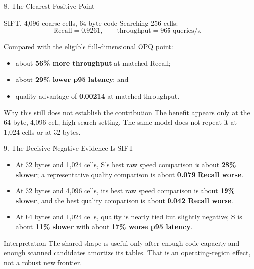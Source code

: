 \documentclass[aspectratio=169]{beamer}
\newcommand{\good}[1]{\textcolor{green!45!black}{\textbf{#1}}}
\newcommand{\bad}[1]{\textcolor{red!75!black}{\textbf{#1}}}
\begin{document}
\begin{frame}{8. The Clearest Positive Point}
\begin{block}{SIFT, 4,096 coarse cells, 64-byte code}
Searching 256 cells:
\[
\text{Recall}=0.9261,\qquad \text{throughput}=966\text{ queries/s}.
\]
\end{block}
Compared with the eligible full-dimensional OPQ point:
\begin{itemize}
  \item about \good{56\% more throughput} at matched Recall;
  \item about \good{29\% lower p95 latency}; and
  \item quality advantage of \good{0.00214} at matched throughput.
\end{itemize}
\begin{alertblock}{Why this still does not establish the contribution}
The benefit appears only at the 64-byte, 4,096-cell, high-search setting.
The same model does not repeat it at 1,024 cells or at 32 bytes.
\end{alertblock}
\end{frame}

\begin{frame}{9. The Decisive Negative Evidence Is SIFT}
\begin{itemize}
  \item At 32 bytes and 1,024 cells, S's best raw speed comparison is about
  \bad{28\% slower}; a representative quality comparison is about
  \bad{0.079 Recall worse}.
  \item At 32 bytes and 4,096 cells, its best raw speed comparison is about
  \bad{19\% slower}, and the best quality comparison is about
  \bad{0.042 Recall worse}.
  \item At 64 bytes and 1,024 cells, quality is nearly tied but slightly
  negative; S is about \bad{11\% slower} with about
  \bad{17\% worse p95 latency}.
\end{itemize}
\begin{block}{Interpretation}
The shared shape is useful only after enough code capacity and enough scanned
candidates amortize its tables. That is an operating-region effect, not a
robust new frontier.
\end{block}
\end{frame}
\end{document}
